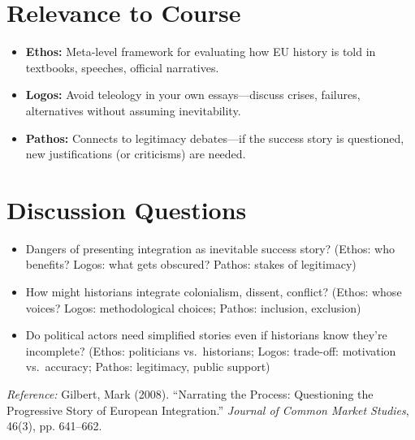 \documentclass[11pt,a4paper]{article}
\begin{document}
\section*{Relevance to Course}

\begin{itemize}
\item \textbf{Ethos:} Meta-level framework for evaluating how EU history is told in textbooks, speeches, official narratives.
\item \textbf{Logos:} Avoid teleology in your own essays---discuss crises, failures, alternatives without assuming inevitability.
\item \textbf{Pathos:} Connects to legitimacy debates---if the success story is questioned, new justifications (or criticisms) are needed.
\end{itemize}

\section*{Discussion Questions}

\begin{itemize}
\item Dangers of presenting integration as inevitable success story? (Ethos: who benefits? Logos: what gets obscured? Pathos: stakes of legitimacy)
\item How might historians integrate colonialism, dissent, conflict? (Ethos: whose voices? Logos: methodological choices; Pathos: inclusion, exclusion)
\item Do political actors need simplified stories even if historians know they're incomplete? (Ethos: politicians vs.\ historians; Logos: trade-off: motivation vs.\ accuracy; Pathos: legitimacy, public support)
\end{itemize}

\vspace{1em}
\noindent\footnotesize\textit{Reference:} Gilbert, Mark (2008). ``Narrating the Process: Questioning the Progressive Story of European Integration.'' \textit{Journal of Common Market Studies}, 46(3), pp. 641--662.
\end{document}
